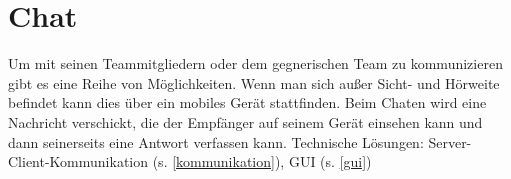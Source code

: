 \section{Chat}
Um mit seinen Teammitgliedern oder dem gegnerischen Team zu kommunizieren gibt es
eine Reihe von Möglichkeiten. Wenn man sich außer Sicht- und Hörweite befindet kann
dies über ein mobiles Gerät stattfinden. Beim Chaten wird eine Nachricht verschickt, die der
Empfänger auf seinem Gerät einsehen kann und dann seinerseits eine Antwort verfassen
kann.
\newline
Technische Lösungen:
Server-Client-Kommunikation (s. \ref{kommunikation}), GUI (s. \ref{gui})
